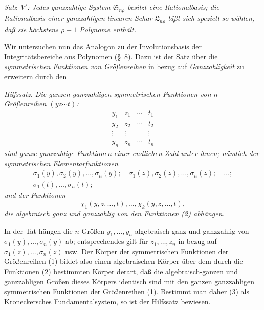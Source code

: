 \documentclass[11pt]{article}
\providecommand{\Ssys}{\mathfrak{S}}
\providecommand{\Lsys}{\mathfrak{L}}
\begin{document}
\emph{Satz V$'$: Jedes ganzzahlige System $\Ssys_{n\rho}$ besitzt eine Rationalbasis; die Rationalbasis einer ganzzahligen linearen Schar $\Lsys_{n\rho}$ läßt sich speziell so wählen, daß sie höchstens $\rho+1$ Polynome enthält.}

Wir untersuchen nun das Analogon zu der Involutionsbasis der Integritätsbereiche aus Polynomen (\S\ 8). Dazu ist der Satz über die \emph{symmetrischen Funktionen von Größenreihen} in bezug auf \emph{Ganzzahligkeit} zu erweitern durch den

\emph{Hilfssatz. Die ganzen ganzzahligen symmetrischen Funktionen von $n$ Größenreihen $(yz\cdots t)$:}
\begin{equation}
\begin{array}{cccc}
  y_1&z_1&\cdots&t_1\\
  y_2&z_2&\cdots&t_2\\
  \vdots&\vdots&&\vdots\\
  y_n&z_n&\cdots&t_n
\end{array}
\tag{1}
\end{equation}
\emph{sind ganze ganzzahlige Funktionen einer endlichen Zahl unter ihnen; nämlich der symmetrischen Elementarfunktionen}
\begin{equation}
\begin{gathered}
  \sigma_1(y),\sigma_2(y),\ldots,\sigma_n(y);\quad
  \sigma_1(z),\sigma_2(z),\ldots,\sigma_n(z);\quad\ldots;\\
  \sigma_1(t),\ldots,\sigma_n(t);
\end{gathered}
\tag{2}
\end{equation}
\emph{und der Funktionen}
\begin{equation}
  \chi_1(y,z,\ldots,t),\ldots,\chi_k(y,z,\ldots,t),
\tag{3}
\end{equation}
\emph{die algebraisch ganz und ganzzahlig von den Funktionen (2) abhängen.}

In der Tat hängen die $n$ Größen $y_1,
\ldots,y_n$ algebraisch ganz und ganzzahlig von $\sigma_1(y),
\ldots,\sigma_n(y)$ ab; entsprechendes gilt für $z_1,
\ldots,z_n$ in bezug auf $\sigma_1(z),
\ldots,\sigma_n(z)$ usw. Der Körper der symmetrischen Funktionen der Größenreihen (1) bildet also einen algebraischen Körper über dem durch die Funktionen (2) bestimmten Körper derart, daß die algebraisch-ganzen und ganzzahligen Größen dieses Körpers identisch sind mit den ganzen ganzzahligen symmetrischen Funktionen der Größenreihen (1). Bestimmt man daher (3) als Kroneckersches Fundamentalsystem, so ist der Hilfssatz bewiesen.
\end{document}
